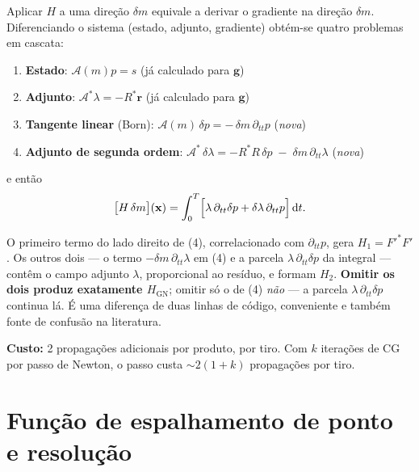\documentclass[11pt,a4paper,oneside]{report}
\begin{document}
\begin{derivacao}
Aplicar $H$ a uma dire\c{c}\~ao $\delta m$ equivale a derivar o gradiente na
dire\c{c}\~ao $\delta m$. Diferenciando o sistema
(estado, adjunto, gradiente) obt\'em-se quatro problemas em cascata:

\begin{enumerate}[leftmargin=*, itemsep=1pt]
\item \textbf{Estado}: $\mathcal{A}(m)p = s$ \hfill (j\'a calculado para
$\mathbf{g}$)
\item \textbf{Adjunto}: $\mathcal{A}^{*}\lambda = -R^{*}\mathbf{r}$
\hfill (j\'a calculado para $\mathbf{g}$)
\item \textbf{Tangente linear} (Born): $\mathcal{A}(m)\,\delta p
 = -\,\delta m\,\partial_{tt}p$ \hfill (\emph{nova})
\item \textbf{Adjunto de segunda ordem}:
 $\mathcal{A}^{*}\,\delta\lambda = -R^{*}R\,\delta p
  \;-\;\delta m\,\partial_{tt}\lambda$ \hfill (\emph{nova})
\end{enumerate}

e ent\~ao
\begin{equation}
\bigl[H\,\delta m\bigr](\mathbf{x})
 = \int_0^T \Bigl[\lambda\,\partial_{tt}\delta p
   + \delta\lambda\,\partial_{tt}p\Bigr]\,\mathrm{d} t .
\end{equation}

O primeiro termo do lado direito de (4), correlacionado com $\partial_{tt}p$,
gera $H_1 = F'^{*}F'$. Os outros dois --- o termo $-\delta m\,\partial_{tt}\lambda$
em (4) e a parcela $\lambda\,\partial_{tt}\delta p$ da integral --- cont\^em o
campo adjunto $\lambda$, proporcional ao res\'iduo, e formam $H_2$.
\textbf{Omitir os dois produz exatamente $H_{\text{GN}}$}; omitir s\'o o de (4)
\emph{n\~ao} --- a parcela $\lambda\,\partial_{tt}\delta p$ continua l\'a. \'E
uma diferen\c{c}a de duas linhas de c\'odigo, conveniente e tamb\'em fonte de
confus\~ao na literatura.

\textbf{Custo:} 2 propaga\c{c}\~oes adicionais por produto, por tiro. Com
$k$ itera\c{c}\~oes de CG por passo de Newton, o passo custa
$\sim 2(1+k)$ propaga\c{c}\~oes por tiro.
\end{derivacao}

\section{Fun\c{c}\~ao de espalhamento de ponto e resolu\c{c}\~ao}
\end{document}
